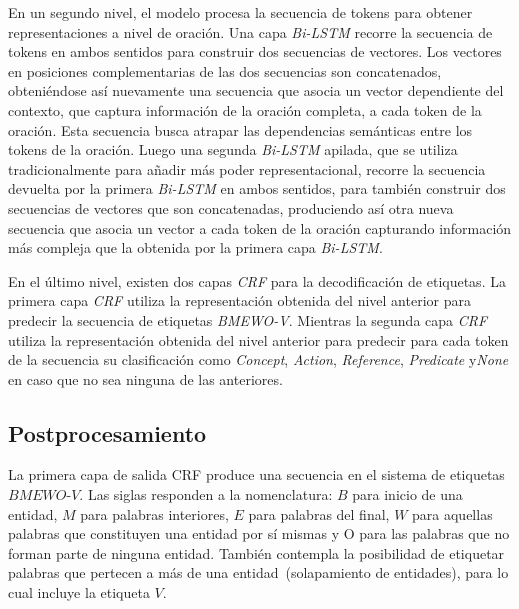 En un segundo nivel, el modelo procesa la secuencia de tokens para obtener representaciones a nivel de oraci\'on. Una capa \emph{Bi-LSTM} recorre la secuencia de tokens en ambos sentidos para construir dos secuencias de vectores. Los vectores en posiciones complementarias de las dos secuencias son concatenados, obteni\'endose as\'i nuevamente una secuencia que asocia un vector dependiente del contexto, que captura informaci\'on de la oraci\'on completa, a cada token de la oraci\'on. Esta secuencia busca atrapar las dependencias semánticas entre los tokens de la oración.
Luego una segunda \emph{Bi-LSTM} apilada, que se utiliza tradicionalmente para a\~nadir m\'as poder representacional, recorre la secuencia devuelta por la primera \emph{Bi-LSTM} en ambos sentidos, para tambi\'en construir dos secuencias de vectores que son concatenadas, produciendo as\'i otra nueva secuencia que asocia un vector a cada token de la oraci\'on capturando informaci\'on m\'as compleja que la obtenida por la primera capa \emph{Bi-LSTM}.

En el \'ultimo nivel, existen dos capas \emph{CRF} para la decodificaci\'on de etiquetas. La primera capa \emph{CRF} utiliza la representaci\'on obtenida del nivel anterior para predecir la secuencia de etiquetas \emph{BMEWO-V}. Mientras la segunda capa \emph{CRF} utiliza la representaci\'on obtenida del nivel anterior para predecir para cada token de la secuencia su clasificaci\'on como \emph{Concept}, \emph{Action}, \emph{Reference}, \emph{Predicate} y\emph{None} en caso que no sea ninguna de las anteriores.

\subsection{Postprocesamiento}
La primera capa de salida CRF produce una secuencia en el sistema de etiquetas $BMEWO$-$V$.
Las siglas responden a la nomenclatura: $B$ para inicio de una entidad, $M$ para palabras interiores, $E$ para palabras del final, $W$ para aquellas palabras que constituyen una entidad por sí mismas y O para las palabras que no forman parte de ninguna entidad.
También contempla la posibilidad de etiquetar palabras que pertecen a más de una entidad~(solapamiento de entidades), para lo cual incluye la etiqueta $V$.


